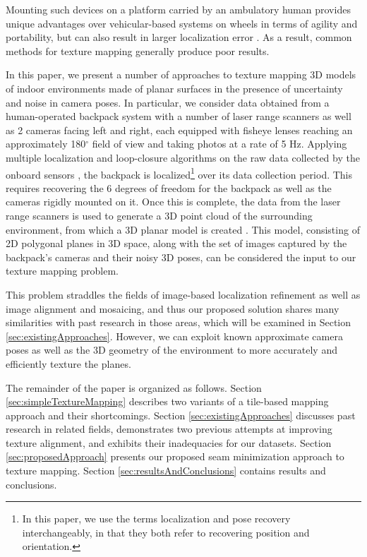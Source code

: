 \message{ !name(oldpaper.tex)}\documentclass[10pt,twocolumn,letterpaper]{article}
\begin{document}
Mounting such devices on a platform carried by an ambulatory human
provides unique advantages over vehicular-based systems on wheels in
terms of agility and portability, but can also result in larger
localization error \cite{liu2010indoor}. As a result, common methods
for texture mapping generally produce poor results.

In this paper, we present a number of approaches to texture mapping 3D
models of indoor environments made of planar surfaces in the presence
of uncertainty and noise in camera poses. In particular, we consider
data obtained from a human-operated backpack system with a number of
laser range scanners as well as 2 cameras facing left and right, each
equipped with fisheye lenses reaching an approximately 180$^{\circ}$
field of view and taking photos at a rate of 5 Hz. Applying multiple
localization and loop-closure algorithms on the raw data collected by
the onboard sensors \cite{chen2010indoor, kua2012loopclosure,
  liu2010indoor}, the backpack is localized\footnote{In this paper, we
  use the terms localization and pose recovery interchangeably, in
  that they both refer to recovering position and orientation.}  over
its data collection period. This requires recovering the 6 degrees of
freedom for the backpack as well as the cameras rigidly mounted on
it. Once this is complete, the data from the laser range scanners is
used to generate a 3D point cloud of the surrounding environment, from which a
3D planar model is created \cite{sanchez2012point}. This model, consisting of 2D
polygonal planes in 3D space, along with the set of images captured by
the backpack's cameras and their noisy 3D poses, can be considered the
input to our texture mapping problem.

This problem straddles the fields of image-based localization
refinement as well as image alignment and mosaicing, and thus our
proposed solution shares many similarities with past research in those
areas, which will be examined in Section
\ref{sec:existingApproaches}. However, we can exploit known
approximate camera poses as well as the 3D geometry of the environment
to more accurately and efficiently texture the planes.

The remainder of the paper is organized as follows. Section
\ref{sec:simpleTextureMapping} describes two variants of a tile-based
mapping approach and their shortcomings.  Section
\ref{sec:existingApproaches} discusses past research in related
fields, demonstrates two previous attempts at improving texture
alignment, and exhibits their inadequacies for our datasets. Section
\ref{sec:proposedApproach} presents our proposed seam minimization
approach to texture mapping. Section \ref{sec:resultsAndConclusions}
contains results and conclusions.
\end{document}
